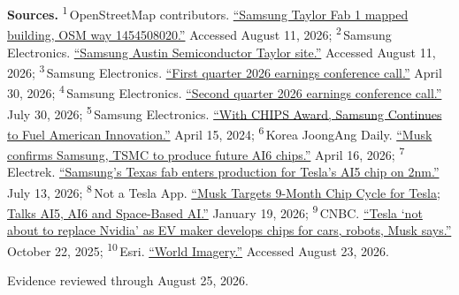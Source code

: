 \begin{minipage}[t][0.90\textheight][t]{\textwidth}
{\sffamily\scriptsize\setlength{\emergencystretch}{1.5em}\textbf{Sources.} \textsuperscript{1}\,OpenStreetMap contributors. \href{\detokenize{https://www.openstreetmap.org/way/1454508020}}{\enquote{Samsung Taylor Fab 1 mapped building, OSM way 1454508020.}} Accessed August 11, 2026; \textsuperscript{2}\,Samsung Electronics. \href{\detokenize{https://semiconductor.samsung.com/sas/company/taylor/}}{\enquote{Samsung Austin Semiconductor Taylor site.}} Accessed August 11, 2026; \textsuperscript{3}\,Samsung Electronics. \href{\detokenize{https://irsvc.teletogether.com/sec/pdf/2026Q1_script_eng.pdf?1=}}{\enquote{First quarter 2026 earnings conference call.}} April 30, 2026; \textsuperscript{4}\,Samsung Electronics. \href{\detokenize{https://irsvc.teletogether.com/sec/pdf/2026Q2_script_eng.pdf?1=}}{\enquote{Second quarter 2026 earnings conference call.}} July 30, 2026; \textsuperscript{5}\,Samsung Electronics. \href{\detokenize{https://image.semiconductor.samsung.com/content/samsung/p6/semiconductor-us/sas/chips-and-science-act_240416/samsung-factsheet-chips-final.pdf}}{\enquote{With CHIPS Award, Samsung Continues to Fuel American Innovation.}} April 15, 2024; \textsuperscript{6}\,Korea JoongAng Daily. \href{\detokenize{https://www.koreajoongangdaily.com/business/musk-confirms-samsung-tsmc-to-produce-future-ai6-chips/12606378}}{\enquote{Musk confirms Samsung, TSMC to produce future AI6 chips.}} April 16, 2026; \textsuperscript{7}\,Electrek. \href{\detokenize{https://electrek.co/2026/07/13/samsung-taylor-fab-tesla-ai5-chip-2nm/}}{\enquote{Samsung's Texas fab enters production for Tesla's AI5 chip on 2nm.}} July 13, 2026; \textsuperscript{8}\,Not a Tesla App. \href{\detokenize{https://www.notateslaapp.com/news/3515/musk-targets-9-month-chip-cycle-for-tesla-talks-ai5-ai6-and-space-based-ai}}{\enquote{Musk Targets 9-Month Chip Cycle for Tesla; Talks AI5, AI6 and Space-Based AI.}} January 19, 2026; \textsuperscript{9}\,CNBC. \href{\detokenize{https://www.cnbc.com/2025/10/22/elon-musk-tesla-ai5-nvidia.html}}{\enquote{Tesla `not about to replace Nvidia' as EV maker develops chips for cars, robots, Musk says.}} October 22, 2025; \textsuperscript{10}\,Esri. \href{\detokenize{https://www.arcgis.com/home/item.html?id=10df2279f9684e4a9f6a7f08febac2a9}}{\enquote{World Imagery.}} Accessed August 23, 2026.\par}
\vfill
\noindent{\color{hairline}\rule{\linewidth}{0.4pt}}\par\smallskip
{\sffamily\scriptsize\color{black!58} Evidence reviewed through August 25, 2026.\par}
\end{minipage}
